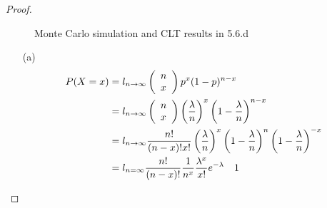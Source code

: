 \begin{proof}
\begin{figure}[tbh!]
		
		\centering
		\caption{Monte Carlo simulation and CLT results in 5.6.d}
		\label{pics56}
		\end{figure}
\begin{enumerate}
	\item[(a)] 
		\begin{equation}
		\begin{aligned}
		\notag
		P(X=x) &=l_{n \rightarrow \infty}\left(\begin{array}{l}
		n \\
		x
		\end{array}\right) p^{x}(1-p)^{n-x}  \\
		&=l_{n \rightarrow \infty}\left(\begin{array}{l}
		n \\
		x
		\end{array}\right)\left(\frac{\lambda}{n}\right)^{x}\left(1-\frac{\lambda}{n}\right)^{n-x}  \\
		&=l_{n \rightarrow \infty} \frac{n !}{(n-x) ! x !}\left(\frac{\lambda}{n}\right)^{x}\left(1-\frac{\lambda}{n}\right)^{n}\left(1-\frac{\lambda}{n}\right)^{-x} \\
		&=l_{n=\infty} \frac{n !}{(n-x) !} \frac{1}{n^{x}} \frac{\lambda^{x}}{x !} e^{-\lambda} \quad 1
		\end{aligned}
		\end{equation}
		

\end{enumerate}
\end{proof}
